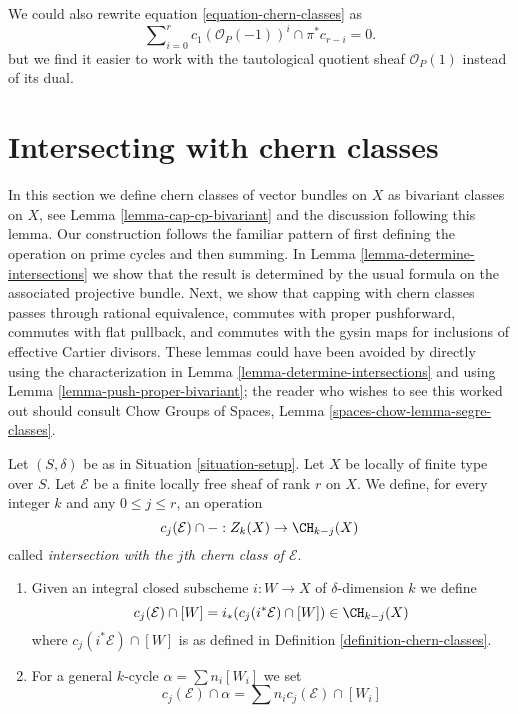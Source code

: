 \begin{remark}
\label{remark-equation-signs}
We could also rewrite equation \ref{equation-chern-classes} as
\begin{equation}
\label{equation-signs}
\sum\nolimits_{i = 0}^r
c_1(\mathcal{O}_P(-1))^i \cap \pi^*c_{r - i}
= 0.
\end{equation}
but we find it easier to work with the tautological quotient
sheaf $\mathcal{O}_P(1)$ instead of
its dual.
\end{remark}




\section{Intersecting with chern classes}
\label{section-intersecting-chern-classes}

\noindent
In this section we define chern classes of vector bundles on $X$ as
bivariant classes on $X$, see Lemma \ref{lemma-cap-cp-bivariant}
and the discussion following this lemma. Our construction follows the familiar
pattern of first defining the operation on prime cycles and then
summing. In Lemma \ref{lemma-determine-intersections} we show
that the result is determined by the usual formula on the associated
projective bundle. Next, we show that capping with chern classes
passes through rational equivalence, commutes with proper pushforward,
commutes with flat pullback, and commutes with the gysin maps for
inclusions of effective Cartier divisors. These lemmas could have been
avoided by directly using the characterization in
Lemma \ref{lemma-determine-intersections} and using
Lemma \ref{lemma-push-proper-bivariant}; the reader who wishes to
see this worked out should consult
Chow Groups of Spaces, Lemma \ref{spaces-chow-lemma-segre-classes}.

\begin{definition}
\label{definition-cap-chern-classes}
Let $(S, \delta)$ be as in Situation \ref{situation-setup}.
Let $X$ be locally of finite type over $S$.
Let $\mathcal{E}$ be a finite locally free sheaf of rank $r$ on $X$.
We define, for every integer $k$ and any $0 \leq j \leq r$,
an operation
$$
c_j(\mathcal{E}) \cap - : Z_k(X) \to \CH_{k - j}(X)
$$
called {\it intersection with the $j$th chern class of $\mathcal{E}$}.
\begin{enumerate}
\item Given an integral closed subscheme $i : W \to X$ of $\delta$-dimension
$k$ we define
$$
c_j(\mathcal{E}) \cap [W] = i_*(c_j({i^*\mathcal{E}}) \cap [W])
\in
\CH_{k - j}(X)
$$
where $c_j({i^*\mathcal{E}}) \cap [W]$ is as defined in
Definition \ref{definition-chern-classes}.
\item For a general $k$-cycle $\alpha = \sum n_i [W_i]$ we set
$$
c_j(\mathcal{E}) \cap \alpha = \sum n_i c_j(\mathcal{E}) \cap [W_i]
$$
\end{enumerate}
\end{definition}

